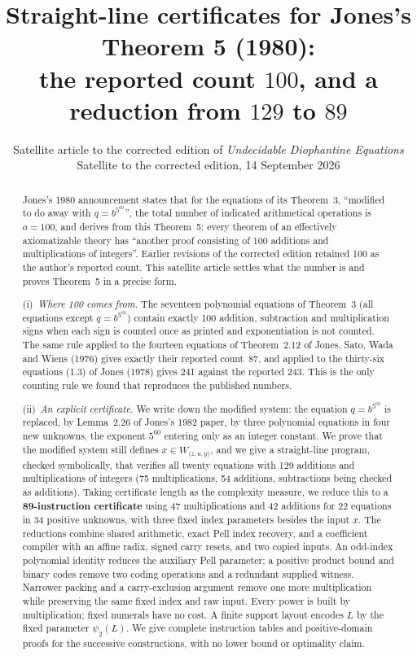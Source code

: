 \documentclass[11pt,letterpaper]{article}
\title{\Large\bfseries Straight-line certificates for Jones's Theorem 5 (1980):\\
 \large the reported count $100$, and a reduction from $129$ to $89$}
\author{\normalsize Satellite article to the corrected edition of
 \textit{Undecidable Diophantine Equations}\\
 \normalsize Satellite to the corrected edition, 14 September 2026}
\date{}
\theoremstyle{definition}
\theoremstyle{remark}
\numberwithin{equation}{section}
\begin{document}
\maketitle

\begin{abstract}
\noindent
Jones's 1980 announcement states that for the equations of its Theorem~3,
``modified to do away with $q=b^{5^{60}}$'', the total number of indicated
arithmetical operations is $o=100$, and derives from this Theorem~5: every
theorem of an effectively axiomatizable theory has ``another proof consisting
of 100 additions and multiplications of integers''. Earlier revisions
of the corrected edition retained 100 as the author's reported count. This
satellite article settles what the number is and proves Theorem~5 in a
precise form.

(i)~\emph{Where 100 comes from.} The seventeen polynomial equations of
Theorem~3 (all equations except $q=b^{5^{60}}$) contain exactly 100
addition, subtraction and multiplication signs when each sign is counted
once as printed and exponentiation is not counted. The same rule applied to
the fourteen equations of Theorem~2.12 of Jones, Sato, Wada and Wiens (1976)
gives exactly their reported count~87, and applied to the thirty-six
equations (1.3) of Jones (1978) gives 241 against the reported 243. This is
the only counting rule we found that reproduces the published numbers.

(ii)~\emph{An explicit certificate.} We write down the modified system:
the equation $q=b^{5^{60}}$ is replaced, by Lemma~2.26 of Jones's 1982
paper, by three polynomial equations in four new unknowns, the exponent
$5^{60}$ entering only as an integer constant. We prove that the modified
system still defines $x\in W_{\langle z,u,y\rangle}$, and we give a
straight-line program, checked symbolically, that verifies all twenty
equations with 129 additions and multiplications of integers (75
multiplications, 54 additions, subtractions being checked as additions).
Taking certificate length as the complexity measure, we reduce this to
a \textbf{89-instruction certificate} using 47
multiplications and 42 additions for 22 equations in 34 positive
unknowns, with three fixed index parameters besides the input $x$.
The reductions combine shared arithmetic, exact Pell index recovery,
and a coefficient compiler with an affine radix, signed carry resets,
and two copied inputs. An odd-index polynomial identity reduces the
auxiliary Pell parameter; a positive product bound and binary codes
remove two coding operations and a redundant supplied witness.
Narrower packing and a carry-exclusion argument remove one more
multiplication while preserving the same fixed index and raw input.
Every power is built by multiplication; fixed numerals have no cost.
A finite support layout encodes $L$ by the fixed parameter $\psi_2(L)$.
We give complete instruction tables and positive-domain proofs for
the successive constructions, with no lower bound or optimality claim.


\end{abstract}
\end{document}
